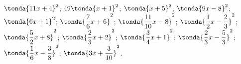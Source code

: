 \begin{esercizio}
 \(\tonda{11 x + 4}^{2}\); \quad 
{} \(49 \tonda{x + 1}^{2}\); \quad 
{} \(\tonda{x + 5}^{2}\); \quad 
{} \(\tonda{9 x - 8}^{2}\); \quad \\
 \(\tonda{6 x + 1}^{2}\); \quad 
{} \(\tonda{\dfrac{7}{6} x + 6}^{2}\); \quad 
{} \(\tonda{\dfrac{11}{10}x - 8}^{2}\); \quad 
{} \(\tonda{\dfrac{1}{2} x - \dfrac{2}{3}}^{2}\); \quad \\
 \(\tonda{\dfrac{5}{2} x + 8}^{2}\); \quad 
{} \(\tonda{\dfrac{2}{3}x + 2}^{2}\); \quad 
{} \(\tonda{\dfrac{3}{4} x + 1}^{2}\); \quad 
{} \(\tonda{\dfrac{2}{3}x - \dfrac{5}{3}}^{2}\); \quad \\
 \(\tonda{\dfrac{1}{6}x - \dfrac{3}{8}}^{2}\); \quad 
{} \(\tonda{3 x + \dfrac{3}{10}}^{2}\).
\end{esercizio}
% 
\subsubsection*{}

